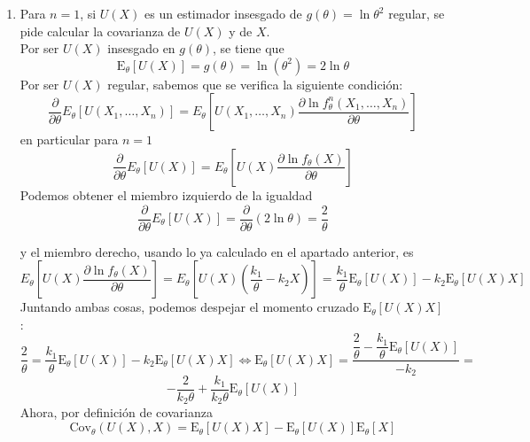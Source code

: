 \documentclass[12pt]{article}
\newcommand{\E}{\mathrm{E}}
\newcommand{\N}{\mathbb{N}}
\begin{document}
\begin{ejercicio}[2 puntos]
\begin{enumerate}[label=\alph*)]
            Tenemos que $0 < I_X(\theta) = \nicefrac{k_1^2}{\theta^2} < + \infty$, y la mínima varianza es entonces, sabiendo que $I_{X_1, \ldots, X_n}(\theta) = n I_X(\theta)$, la que sigue:

            $$\dfrac{[g'(\theta)]^2}{I_{X_1, \ldots, X_n}(\theta)} = \dfrac{[g'(\theta)]^2}{n I_{X}(\theta)} = \dfrac{4}{\theta^2} \dfrac{\theta^2}{n k_1^2} \stackrel{\theta>0}{=} \dfrac{4}{n k_1^2}$$

            Imponemos que esta cota inferior sea mayor o igual que $0{.}2$, y despejamos $n$:

            $$\dfrac{4}{n k_1^2} \geq 0{.}2 \iff  n \leq \dfrac{4}{0{.}2 k_1^2} = \dfrac{20}{k_1^2}$$

            Así, para todo $n \in \N$ con $n \leq \nicefrac{20}{k_1^2}$, podemos asegurar que la varianza de cualquier estimador regular insesgado en $g(\theta) = \ln\theta^2$ será mayor o igual que $0.2$ para cualquier valor del parámetro $\theta$.

            \item Para $n=1$, si $U(X)$ es un estimador insesgado de $g(\theta)=\ln\theta^2$ regular, se pide calcular la covarianza de $U(X)$ y de $X$. \\
            
            Por ser $U(X)$ insesgado en $g(\theta)$, se tiene que 
            $$\E_\theta[U(X)] = g(\theta) = \ln(\theta^2) = 2 \ln \theta$$
            Por ser $U(X)$ regular, sabemos que se verifica la siguiente condición:
            $$\dfrac{\partial}{\partial \theta} E_\theta[U(X_1, \ldots, X_n)] = E_\theta \left[U(X_1, \ldots, X_n) \dfrac{\partial \ln f_\theta^n (X_1, \ldots, X_n)}
            {\partial \theta} \right]$$
            en particular para $n=1$
            $$\dfrac{\partial}{\partial \theta} E_\theta[U(X)] = E_\theta \left[U(X) \dfrac{\partial \ln f_\theta (X)}
            {\partial \theta} \right]$$
            Podemos obtener el miembro izquierdo de la igualdad
            $$\dfrac{\partial}{\partial \theta} E_\theta[U(X)] = \dfrac{\partial}{\partial \theta} (2 \ln \theta) = \dfrac{2}{\theta}$$

            y el miembro derecho, usando lo ya calculado en el apartado anterior, es
            $$E_\theta \left[U(X) \dfrac{\partial \ln f_\theta (X)}
            {\partial \theta} \right] = E_\theta \left[U(X) \left( \dfrac{k_1}{\theta} - k_2 X \right) \right] = \dfrac{k_1}{\theta} \E_\theta [U(X)] - k_2 \E_\theta[U(X)X]$$
            Juntando ambas cosas, podemos despejar el momento cruzado $\E_\theta[U(X)X]$:
            $$\dfrac{2}{\theta} = \dfrac{k_1}{\theta} \E_\theta [U(X)] - k_2 \E_\theta[U(X)X] \iff \E_\theta[U(X)X] = \dfrac{\dfrac{2}{\theta} - \dfrac{k_1}{\theta} \E_\theta [U(X)]}{-k_2} = $$ 
            $$ - \dfrac{2}{k_2\theta} + \dfrac{k_1}{k_2 \theta} \E_\theta [U(X)]$$
            Ahora, por definición de covarianza
            $$\text{Cov}_\theta(U(X),X) = \E_\theta[U(X) X] - \E_\theta[U(X)] \E_\theta[X]$$


\end{enumerate}
\end{ejercicio}
\end{document}
